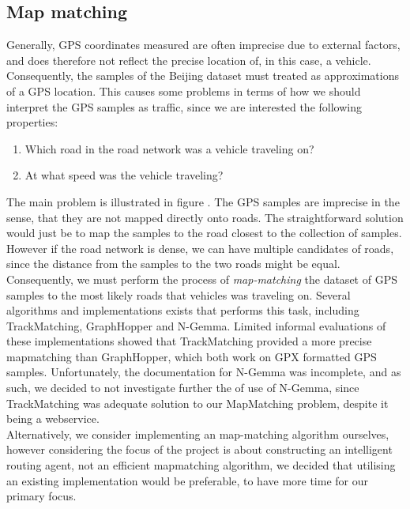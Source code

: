 \subsection{Map matching}
Generally, GPS coordinates measured are often imprecise due to external factors, and does therefore not reflect the precise location of, in this case, a vehicle. Consequently, the samples of the Beijing dataset must treated as approximations of a GPS location. This causes some problems in terms of how we should interpret the GPS samples as traffic, since we are interested the following properties:
\begin{enumerate}
\item Which road in the road network was a vehicle traveling on?
\item At what speed was the vehicle traveling?
\end{enumerate}
The main problem is illustrated in figure . The GPS samples are imprecise in the sense, that they are not mapped directly onto roads. The straightforward solution would just be to map the samples to the road closest to the collection of samples. However if the road network is dense, we can have multiple candidates of roads, since the distance from the samples to the two roads might be equal.\\
Consequently, we must perform the process of \emph{map-matching} the dataset of GPS samples to the most likely roads that vehicles was traveling on. Several algorithms and implementations exists that performs this task, including TrackMatching, GraphHopper and N-Gemma. Limited informal evaluations of these implementations showed that TrackMatching provided a more precise mapmatching than GraphHopper, which both work on GPX formatted GPS samples. Unfortunately, the documentation for N-Gemma was incomplete, and as such, we decided to not investigate further the of use of N-Gemma, since TrackMatching was adequate solution to our MapMatching problem, despite it being a webservice.\\ Alternatively, we consider implementing an map-matching algorithm ourselves, however considering the focus of the project is about constructing an intelligent routing agent, not an efficient mapmatching algorithm, we decided that utilising an existing implementation would be preferable, to have more time for our primary focus.